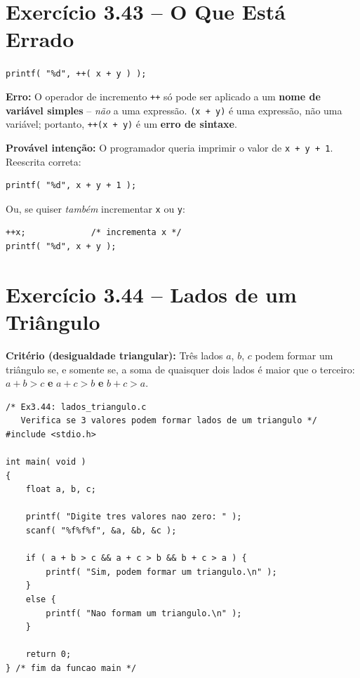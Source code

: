 \documentclass[12pt,a4paper]{article}
\begin{document}
\newpage

\section{Exercício 3.43 -- O Que Está Errado}

\begin{enunciadoBox}[Enunciado 3.43]
\texttt{printf( "\%d", ++( x + y ) );}
\end{enunciadoBox}

\begin{respostabox}
\textbf{Erro:} O operador de incremento \texttt{++} só pode ser aplicado a um
\textbf{nome de variável simples} -- \textit{não} a uma expressão. \texttt{(x + y)}
é uma expressão, não uma variável; portanto, \texttt{++(x + y)} é um \textbf{erro de sintaxe}.

\medskip\textbf{Provável intenção:} O programador queria imprimir o valor de
\texttt{x + y + 1}. Reescrita correta:
\begin{lstlisting}
printf( "%d", x + y + 1 );
\end{lstlisting}

Ou, se quiser \textit{também} incrementar \texttt{x} ou \texttt{y}:
\begin{lstlisting}
++x;             /* incrementa x */
printf( "%d", x + y );
\end{lstlisting}
\end{respostabox}

\section{Exercício 3.44 -- Lados de um Triângulo}

\begin{respostabox}
\textbf{Critério (desigualdade triangular):} Três lados $a$, $b$, $c$ podem formar
um triângulo se, e somente se, a soma de quaisquer dois lados é maior que o terceiro:
$a+b > c$ \textbf{e} $a+c > b$ \textbf{e} $b+c > a$.

\begin{lstlisting}
/* Ex3.44: lados_triangulo.c
   Verifica se 3 valores podem formar lados de um triangulo */
#include <stdio.h>

int main( void )
{
    float a, b, c;

    printf( "Digite tres valores nao zero: " );
    scanf( "%f%f%f", &a, &b, &c );

    if ( a + b > c && a + c > b && b + c > a ) {
        printf( "Sim, podem formar um triangulo.\n" );
    }
    else {
        printf( "Nao formam um triangulo.\n" );
    }

    return 0;
} /* fim da funcao main */
\end{lstlisting}
\end{respostabox}
\end{document}
